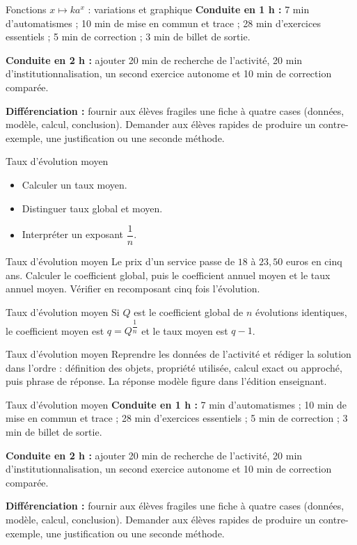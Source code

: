 \documentclass[aspectratio=169,10pt]{beamer}
\begin{document}
\begin{frame}{Fonctions \(x\mapsto k a^x\) : variations et graphique}
\textbf{Conduite en 1 h :} 7 min d'automatismes ; 10 min de mise en commun et trace ; 28 min d'exercices essentiels ; 5 min de correction ; 3 min de billet de sortie.

\textbf{Conduite en 2 h :} ajouter 20 min de recherche de l'activité, 20 min d'institutionnalisation, un second exercice autonome et 10 min de correction comparée.

\textbf{Différenciation :} fournir aux élèves fragiles une fiche à quatre cases (données, modèle, calcul, conclusion). Demander aux élèves rapides de produire un contre-exemple, une justification ou une seconde méthode.
\end{frame}
\begin{frame}{Taux d'évolution moyen}
\begin{itemize}
\item Calculer un taux moyen.
\item Distinguer taux global et moyen.
\item Interpréter un exposant \(\dfrac1n\).

\end{itemize}
\end{frame}
\begin{frame}{Taux d'évolution moyen}
Le prix d'un service passe de \(18\) à \(23{,}50\) euros en cinq ans. Calculer le coefficient global, puis le coefficient annuel moyen et le taux annuel moyen. Vérifier en recomposant cinq fois l'évolution.
\end{frame}
\begin{frame}{Taux d'évolution moyen}
Si \(Q\) est le coefficient global de \(n\) évolutions identiques, le coefficient moyen est \(q=Q^{\dfrac1n}\) et le taux moyen est \(q-1\).
\end{frame}
\begin{frame}{Taux d'évolution moyen}
Reprendre les données de l'activité et rédiger la solution dans l'ordre : définition des objets, propriété utilisée, calcul exact ou approché, puis phrase de réponse. La réponse modèle figure dans l'édition enseignant.
\end{frame}
\begin{frame}{Taux d'évolution moyen}
\textbf{Conduite en 1 h :} 7 min d'automatismes ; 10 min de mise en commun et trace ; 28 min d'exercices essentiels ; 5 min de correction ; 3 min de billet de sortie.

\textbf{Conduite en 2 h :} ajouter 20 min de recherche de l'activité, 20 min d'institutionnalisation, un second exercice autonome et 10 min de correction comparée.

\textbf{Différenciation :} fournir aux élèves fragiles une fiche à quatre cases (données, modèle, calcul, conclusion). Demander aux élèves rapides de produire un contre-exemple, une justification ou une seconde méthode.
\end{frame}
\end{document}
